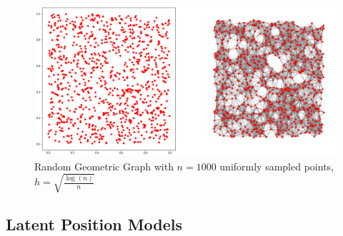 \documentclass{article}
\begin{document}
\begin{figure}
    \centering
    \includegraphics[width=1\textwidth]{sparse_rgg.png}
    \caption{Random Geometric Graph with $n=1000$ uniformly sampled points, $h=\sqrt{\frac{\log(n)}{n}}$}
    \label{Rgg_fig}
\end{figure}

\subsection{Latent Position Models}
\end{document}
